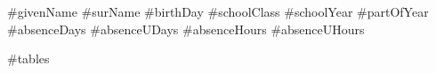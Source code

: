 \documentclass[11pt,a4paper]{article}
\begin{document}
#givenName
#surName
#birthDay
#schoolClass
#schoolYear
#partOfYear
#absenceDays
#absenceUDays
#absenceHours
#absenceUHours

#tables
\end{document}
